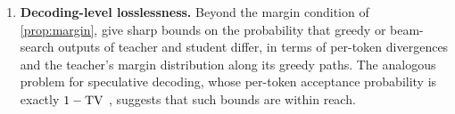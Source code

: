 \begin{enumerate}[leftmargin=*,label=\textbf{P\arabic*.}]
\item \textbf{Decoding-level losslessness.} Beyond the margin condition of \cref{prop:margin}, give sharp
bounds on the probability that greedy or beam-search outputs of teacher and student differ, in terms
of per-token divergences and the teacher's margin distribution along its greedy paths. The analogous
problem for speculative decoding, whose per-token acceptance probability is exactly $1-\mathrm{TV}$
\citep{leviathan2023fast}, suggests
that such bounds are within reach.
\end{enumerate}
